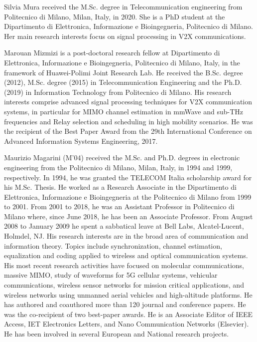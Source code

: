 \documentclass[journal]{IEEEtran}
\begin{document}
\begin{IEEEbiography}{Silvia Mura} received the M.Sc. degree in Telecommunication engineering from Politecnico di Milano, Milan, Italy, in 2020. She is a PhD student at the Dipartimento di Elettronica, Informazione e Bioingegneria, Politecnico di Milano.  Her main research interests focus on signal processing in V2X communications. 
\end{IEEEbiography}



\begin{IEEEbiography} {Marouan Mizmizi} is a post-doctoral research fellow at Dipartimento di Elettronica, Informazione e Bioingegneria, Politecnico di Milano, Italy, in the framework of Huawei-Polimi Joint Research Lab. He received the B.Sc. degree (2012), M.Sc. degree (2015) in Telecommunication Engineering and the Ph.D. (2019) in Information Technology from Politecnico di Milano. His research interests comprise advanced signal processing techniques for V2X communication systems, in particular for MIMO channel estimation in mmWave and sub-THz frequencies and Relay selection and scheduling in high mobility scenarios. He was the recipient of the Best Paper Award from the 29th International Conference on Advanced Information Systems Engineering, 2017.
\end{IEEEbiography}


\begin{IEEEbiography} {Maurizio Magarini} (M'04) received the M.Sc. and Ph.D. degrees in electronic engineering from the Politecnico di Milano, Milan, Italy, in 1994 and 1999, respectively. In 1994, he was granted the TELECOM Italia scholarship award for his M.Sc. Thesis. He worked as a Research Associate in the Dipartimento di Elettronica, Informazione e Bioingegneria at the Politecnico di Milano from 1999 to 2001. From 2001 to 2018, he was an Assistant Professor in Politecnico di Milano where, since June 2018, he has been an Associate Professor. From August 2008 to January 2009 he spent a sabbatical leave at Bell Labs, Alcatel-Lucent, Holmdel, NJ. His research interests are in the broad area of communication and information theory. Topics include synchronization, channel estimation, equalization and coding applied to wireless and optical communication systems. His most recent research activities have focused on molecular communications, massive MIMO, study of waveforms for 5G cellular systems, vehicular communications, wireless sensor networks for mission critical applications, and wireless networks using unmanned aerial  vehicles and high-altitude platforms. He has authored and coauthored more than 120 journal and conference papers. He was the co-recipient of two best-paper awards. He is an Associate Editor of IEEE Access, IET Electronics Letters, and Nano Communication Networks (Elsevier). He has been involved in several European and National research projects.
\end{IEEEbiography}
\end{document}
